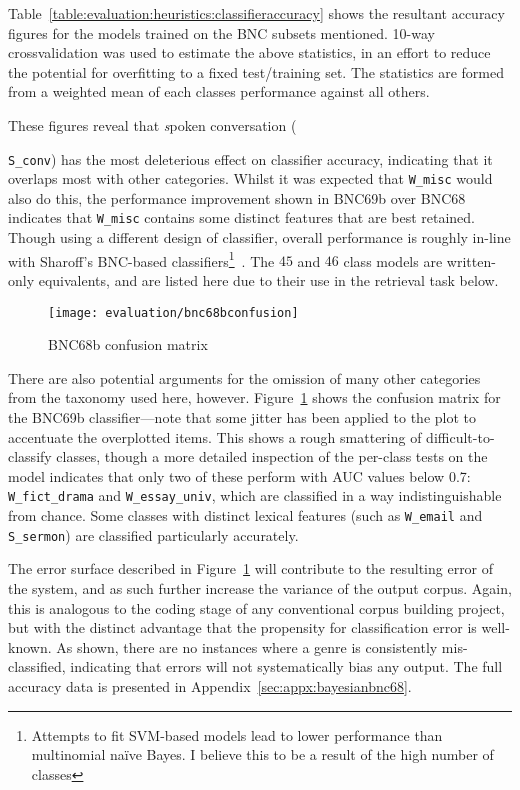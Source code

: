 Table~\ref{table:evaluation:heuristics:classifieraccuracy} shows the resultant accuracy figures for the models trained on the BNC subsets mentioned.  10-way crossvalidation was used to estimate the above statistics, in an effort to reduce the potential for overfitting to a fixed test/training set.  The statistics are formed from a weighted mean of each classes performance against all others.

These figures reveal that {\textsl spoken conversation} ({\texttt{S\_conv}) has the most deleterious effect on classifier accuracy, indicating that it overlaps most with other categories.  Whilst it was expected that \texttt{W\_misc} would also do this, the performance improvement shown in BNC69b over BNC68 indicates that \texttt{W\_misc} contains some distinct features that are best retained.  Though using a different design of classifier, overall performance is roughly in-line with Sharoff's BNC-based classifiers\footnote{Attempts to fit SVM-based models lead to lower performance than multinomial na\"ive Bayes.  I believe this to be a result of the high number of classes}~\cite[ibid.]{sharoff2007classifying}.  The $45$ and $46$ class models are written-only equivalents, and are listed here due to their use in the retrieval task below.

    

\begin{figure}[Ht]
    \centering
    \texttt{[image: evaluation/bnc68bconfusion]}
    \caption{BNC68b confusion matrix}
    \label{fig:evaluation:heuristics:bnc68bconfusion}
\end{figure}



There are also potential arguments for the omission of many other categories from the taxonomy used here, however.  Figure~\ref{fig:evaluation:heuristics:bnc68bconfusion} shows the confusion matrix for the BNC69b classifier---note that some jitter has been applied to the plot to accentuate the overplotted items.  This shows a rough smattering of difficult-to-classify classes, though a more detailed inspection of the per-class tests on the model indicates that only two of these perform with AUC values below 0.7: \texttt{W\_fict\_drama} and \texttt{W\_essay\_univ}, which are classified in a way indistinguishable from chance.  Some classes with distinct lexical features (such as \texttt{W\_email} and \texttt{S\_sermon}) are classified particularly accurately.

The error surface described in Figure~\ref{fig:evaluation:heuristics:bnc68bconfusion} will contribute to the resulting error of the system, and as such further increase the variance of the output corpus.  Again, this is analogous to the coding stage of any conventional corpus building project, but with the distinct advantage that the propensity for classification error is well-known.  As shown, there are no instances where a genre is consistently mis-classified, indicating that errors will not systematically bias any output.  The full accuracy data is presented in Appendix~\ref{sec:appx:bayesianbnc68}.

}
